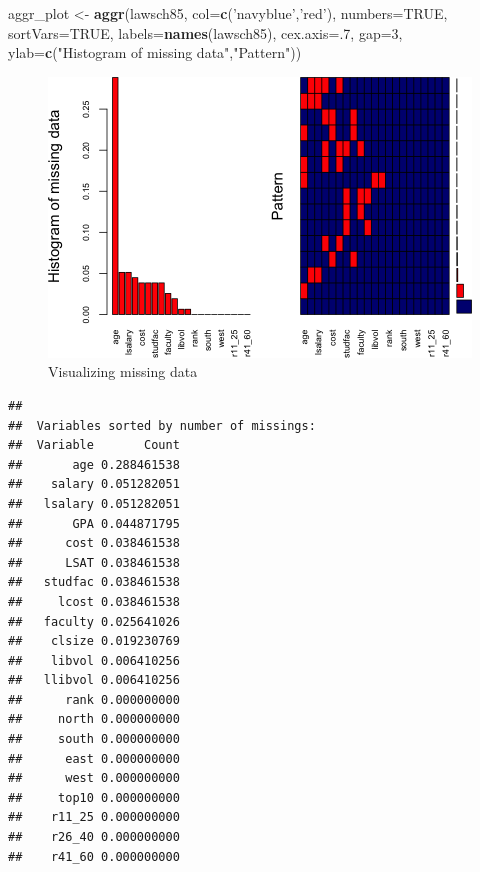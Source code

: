 \documentclass[]{book}
\newenvironment{Shaded}{\begin{snugshade}}{\end{snugshade}}
\newcommand{\DataTypeTok}[1]{\textcolor[rgb]{0.13,0.29,0.53}{#1}}
\newcommand{\DecValTok}[1]{\textcolor[rgb]{0.00,0.00,0.81}{#1}}
\newcommand{\KeywordTok}[1]{\textcolor[rgb]{0.13,0.29,0.53}{\textbf{#1}}}
\newcommand{\NormalTok}[1]{#1}
\newcommand{\OtherTok}[1]{\textcolor[rgb]{0.56,0.35,0.01}{#1}}
\newcommand{\StringTok}[1]{\textcolor[rgb]{0.31,0.60,0.02}{#1}}
\begin{document}
\begin{Shaded}
\begin{Highlighting}[]
\NormalTok{aggr_plot <-}\StringTok{ }\KeywordTok{aggr}\NormalTok{(lawsch85, }\DataTypeTok{col=}\KeywordTok{c}\NormalTok{(}\StringTok{'navyblue'}\NormalTok{,}\StringTok{'red'}\NormalTok{), }\DataTypeTok{numbers=}\OtherTok{TRUE}\NormalTok{, }\DataTypeTok{sortVars=}\OtherTok{TRUE}\NormalTok{, }\DataTypeTok{labels=}\KeywordTok{names}\NormalTok{(lawsch85), }\DataTypeTok{cex.axis=}\NormalTok{.}\DecValTok{7}\NormalTok{, }\DataTypeTok{gap=}\DecValTok{3}\NormalTok{, }\DataTypeTok{ylab=}\KeywordTok{c}\NormalTok{(}\StringTok{"Histogram of missing data"}\NormalTok{,}\StringTok{"Pattern"}\NormalTok{))}
\end{Highlighting}
\end{Shaded}

\begin{figure}

{\centering \includegraphics[width=0.8\linewidth]{MEM5220_R_files/figure-latex/fig20-1} 

}

\caption{Visualizing missing data}\label{fig:fig20}
\end{figure}

\begin{verbatim}
## 
##  Variables sorted by number of missings: 
##  Variable       Count
##       age 0.288461538
##    salary 0.051282051
##   lsalary 0.051282051
##       GPA 0.044871795
##      cost 0.038461538
##      LSAT 0.038461538
##   studfac 0.038461538
##     lcost 0.038461538
##   faculty 0.025641026
##    clsize 0.019230769
##    libvol 0.006410256
##   llibvol 0.006410256
##      rank 0.000000000
##     north 0.000000000
##     south 0.000000000
##      east 0.000000000
##      west 0.000000000
##     top10 0.000000000
##    r11_25 0.000000000
##    r26_40 0.000000000
##    r41_60 0.000000000
\end{verbatim}
\end{document}
